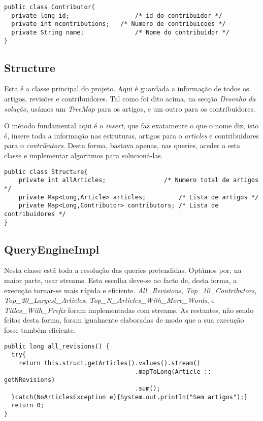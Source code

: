 \documentclass{article}
\begin{document}
\begin{lstlisting}
public class Contributor{
  private long id;                  /* id do contribuidor */
  private int ncontributions;   /* Numero de contribuicoes */
  private String name;              /* Nome do contribuidor */
}
\end{lstlisting}
\subsection{Structure}
\par Esta é a classe principal do projeto. Aqui é guardada a informação de todos os artigos, revisões e contribuidores. Tal como foi dito acima, na secção \emph{Desenho da solução}, usámos um \emph{TreeMap} para os artigos, e um outro para os contribuidores.
\par O método fundamental aqui é o \emph{insert}, que faz exatamente o que o nome diz, isto é, insere toda a informação nas estruturas, artigos para o \emph{articles} e contribuidores para o \emph{contributors}. Desta forma, bastava apenas, nas queries, aceder a esta classe e implementar algoritmos para solucioná-las.

\begin{lstlisting}
public class Structure{
    private int allArticles;                /* Numero total de artigos */
    private Map<Long,Article> articles;         /* Lista de artigos */
    private Map<Long,Contributor> contributors; /* Lista de contribuidores */
}
\end{lstlisting}

\subsection{QueryEngineImpl}
\par Nesta classe está toda a resolução das queries pretendidas. Optámos por, na maior parte, usar streams. Esta escolha deve-se ao facto de, desta forma, a execução tornar-se mais rápida e eficiente. \emph{All\_Revisions}, \emph{Top\_10\_Contributors}, \emph{Top\_20\_Largest\_Articles}, \emph{Top\_N\_Articles\_With\_More\_Words}, e \emph{Titles\_With\_Prefix} foram implementadas com streams. As restantes, não sendo feitas desta forma, foram igualmente elaboradas de modo que a sua execução fosse também eficiente.

\begin{lstlisting}
public long all_revisions() {
  try{
    return this.struct.getArticles().values().stream()
    								.mapToLong(Article :: getNRevisions)
    								.sum();
  }catch(NoArticlesException e){System.out.println("Sem artigos");}
  return 0;
}
\end{lstlisting}
\end{document}
